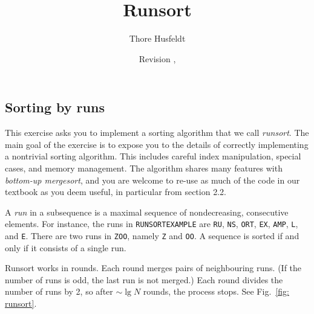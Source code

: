 \documentclass{tufte-handout}
\title{Runsort}
\author{Thore Husfeldt}
\date{\small Revision \GITAbrHash, \GITAuthorDate}
\begin{document}
\maketitle
\subsection{Sorting by runs}

This exercise asks you to implement a sorting algorithm that we call \emph{runsort}.
The main goal of the exercise is to expose you to the details of correctly implementing a nontrivial sorting algorithm.
This includes careful index manipulation, special cases, and memory management.
The algorithm shares many features with \emph{bottom-up mergesort}, and you are welcome to re-use as much of the code in our textbook as you deem useful, in particular from section 2.2.

\medskip
A \emph{run} in a subsequence is a maximal sequence of nondecreasing, consecutive elements.
For instance, the runs in  \texttt{RUNSORTEXAMPLE} are \texttt{RU}, \texttt{NS}, \texttt{ORT}, \texttt{EX}, \texttt{AMP}, \texttt{L}, and \texttt{E}.
There are two runs in \texttt{ZOO}, namely \texttt{Z} and \texttt{OO}.
A sequence is sorted if and only if it consists of a single run.

Runsort works in rounds.
Each round merges pairs of neighbouring runs.
(If the number of runs is odd, the last run is not merged.)
Each round divides the number of runs by 2, so after $\sim\!\operatorname{lg} N$ rounds, the process stops.
See Fig.~\ref{fig: runsort}.
\end{document}
